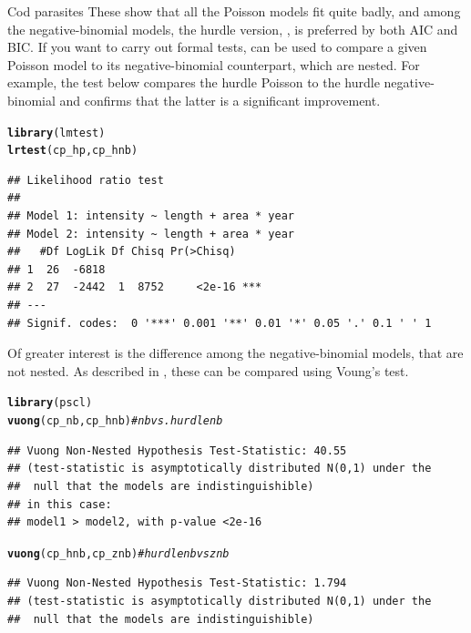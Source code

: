 \documentclass[11pt]{book}\usepackage[]{graphicx}\usepackage[]{color}
\makeatletter
\newcommand{\hlcom}[1]{\textcolor[rgb]{0.678,0.584,0.686}{\textit{#1}}}%
\newcommand{\hlstd}[1]{\textcolor[rgb]{0.345,0.345,0.345}{#1}}%
\newcommand{\hlkwd}[1]{\textcolor[rgb]{0.737,0.353,0.396}{\textbf{#1}}}%
\newenvironment{kframe}{%
 \def\at@end@of@kframe{}%
 \ifinner\ifhmode%
  \def\at@end@of@kframe{\end{minipage}}%
  \begin{minipage}{\columnwidth}%
 \fi\fi%
 \def\FrameCommand##1{\hskip\@totalleftmargin \hskip-\fboxsep
 \colorbox{shadecolor}{##1}\hskip-\fboxsep
     \hskip-\linewidth \hskip-\@totalleftmargin \hskip\columnwidth}%
 \MakeFramed {\advance\hsize-\width
   \@totalleftmargin\z@ \linewidth\hsize
   \@setminipage}}%
 {\par\unskip\endMakeFramed%
 \at@end@of@kframe}
\newenvironment{knitrout}{}{} %
\renewenvironment{knitrout}{\small\renewcommand{\baselinestretch}{.85}}{} %
\makeatother
\begin{document}
\begin{Example}[cod2]{Cod parasites}
These show that all the Poisson models fit quite badly, and among the negative-binomial models,
the hurdle version, , is preferred by both AIC and BIC.
If you want to carry out formal tests,  can be used to compare
a given Poisson model to its negative-binomial counterpart, which are nested.
For example, the test below compares the hurdle Poisson to the hurdle
negative-binomial and confirms that the latter is a significant improvement.
\begin{knitrout}
\color{fgcolor}\begin{kframe}
\begin{alltt}
\hlkwd{library}\hlstd{(lmtest)}
\hlkwd{lrtest}\hlstd{(cp_hp, cp_hnb)}
\end{alltt}
\begin{verbatim}
## Likelihood ratio test
## 
## Model 1: intensity ~ length + area * year
## Model 2: intensity ~ length + area * year
##   #Df LogLik Df Chisq Pr(>Chisq)    
## 1  26  -6818                        
## 2  27  -2442  1  8752     <2e-16 ***
## ---
## Signif. codes:  0 '***' 0.001 '**' 0.01 '*' 0.05 '.' 0.1 ' ' 1
\end{verbatim}
\end{kframe}
\end{knitrout}
Of greater interest is the difference among the negative-binomial models,
that are not nested.  As described in ,
these can be compared using Voung's test.
\begin{knitrout}
\color{fgcolor}\begin{kframe}
\begin{alltt}
\hlkwd{library}\hlstd{(pscl)}
\hlkwd{vuong}\hlstd{(cp_nb, cp_hnb)}     \hlcom{# nb vs. hurdle nb}
\end{alltt}
\begin{verbatim}
## Vuong Non-Nested Hypothesis Test-Statistic: 40.55 
## (test-statistic is asymptotically distributed N(0,1) under the
##  null that the models are indistinguishible)
## in this case:
## model1 > model2, with p-value <2e-16
\end{verbatim}
\begin{alltt}
\hlkwd{vuong}\hlstd{(cp_hnb, cp_znb)}    \hlcom{# hurdle nb vs znb}
\end{alltt}
\begin{verbatim}
## Vuong Non-Nested Hypothesis Test-Statistic: 1.794 
## (test-statistic is asymptotically distributed N(0,1) under the
##  null that the models are indistinguishible)

\end{verbatim}
\end{kframe}
\end{knitrout}
\end{Example}
\end{document}
